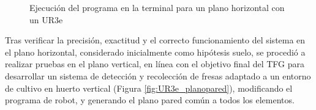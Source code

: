    \begin{figure}[H]
      \begin{center}
        \subcapcentertrue
        \hspace{1mm}
      \end{center}
      \caption{Ejecución del programa en la terminal para un plano horizontal con un UR3e}
      \label{fig:POV_Camara_UR3e_planomesa}
   \end{figure}

\pagebreak
Tras verificar la precisión, exactitud y el correcto funcionamiento del sistema en el plano horizontal, considerado inicialmente como hipótesis suelo, se procedió a realizar pruebas en el plano vertical, en línea con el objetivo final del TFG para desarrollar un sistema de detección y recolección de fresas adaptado a un entorno de cultivo en huerto vertical (Figura \ref{fig:UR3e_planopared}), modificando el programa de robot, y generando el plano pared común a todos los elementos. 

